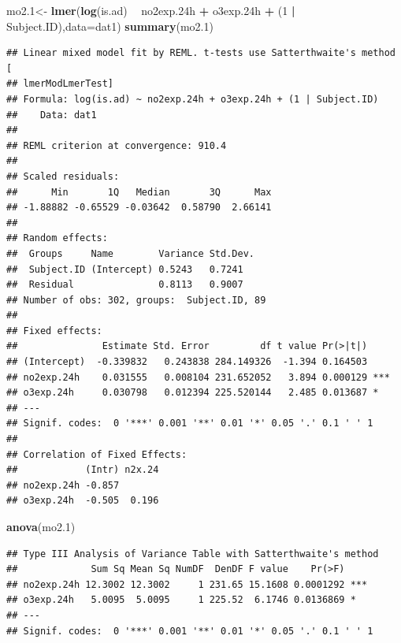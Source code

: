 \documentclass[12pt,]{article}
\newenvironment{Shaded}{\begin{snugshade}}{\end{snugshade}}
\newcommand{\DataTypeTok}[1]{\textcolor[rgb]{0.13,0.29,0.53}{#1}}
\newcommand{\DecValTok}[1]{\textcolor[rgb]{0.00,0.00,0.81}{#1}}
\newcommand{\FloatTok}[1]{\textcolor[rgb]{0.00,0.00,0.81}{#1}}
\newcommand{\KeywordTok}[1]{\textcolor[rgb]{0.13,0.29,0.53}{\textbf{#1}}}
\newcommand{\NormalTok}[1]{#1}
\newcommand{\OperatorTok}[1]{\textcolor[rgb]{0.81,0.36,0.00}{\textbf{#1}}}
\newcommand{\StringTok}[1]{\textcolor[rgb]{0.31,0.60,0.02}{#1}}
\begin{document}
\begin{Shaded}
\begin{Highlighting}[]
\NormalTok{mo2}\FloatTok{.1}\NormalTok{<-}\StringTok{ }\KeywordTok{lmer}\NormalTok{(}\KeywordTok{log}\NormalTok{(is.ad) }\OperatorTok{~}\StringTok{ }\NormalTok{no2exp}\FloatTok{.24}\NormalTok{h }\OperatorTok{+}\StringTok{ }\NormalTok{o3exp}\FloatTok{.24}\NormalTok{h }\OperatorTok{+}\StringTok{ }\NormalTok{(}\DecValTok{1} \OperatorTok{|}\StringTok{ }\NormalTok{Subject.ID),}\DataTypeTok{data=}\NormalTok{dat1)}
\KeywordTok{summary}\NormalTok{(mo2}\FloatTok{.1}\NormalTok{)}
\end{Highlighting}
\end{Shaded}

\begin{verbatim}
## Linear mixed model fit by REML. t-tests use Satterthwaite's method [
## lmerModLmerTest]
## Formula: log(is.ad) ~ no2exp.24h + o3exp.24h + (1 | Subject.ID)
##    Data: dat1
## 
## REML criterion at convergence: 910.4
## 
## Scaled residuals: 
##      Min       1Q   Median       3Q      Max 
## -1.88882 -0.65529 -0.03642  0.58790  2.66141 
## 
## Random effects:
##  Groups     Name        Variance Std.Dev.
##  Subject.ID (Intercept) 0.5243   0.7241  
##  Residual               0.8113   0.9007  
## Number of obs: 302, groups:  Subject.ID, 89
## 
## Fixed effects:
##               Estimate Std. Error         df t value Pr(>|t|)    
## (Intercept)  -0.339832   0.243838 284.149326  -1.394 0.164503    
## no2exp.24h    0.031555   0.008104 231.652052   3.894 0.000129 ***
## o3exp.24h     0.030798   0.012394 225.520144   2.485 0.013687 *  
## ---
## Signif. codes:  0 '***' 0.001 '**' 0.01 '*' 0.05 '.' 0.1 ' ' 1
## 
## Correlation of Fixed Effects:
##            (Intr) n2x.24
## no2exp.24h -0.857       
## o3exp.24h  -0.505  0.196
\end{verbatim}

\begin{Shaded}
\begin{Highlighting}[]
\KeywordTok{anova}\NormalTok{(mo2}\FloatTok{.1}\NormalTok{)}
\end{Highlighting}
\end{Shaded}

\begin{verbatim}
## Type III Analysis of Variance Table with Satterthwaite's method
##             Sum Sq Mean Sq NumDF  DenDF F value    Pr(>F)    
## no2exp.24h 12.3002 12.3002     1 231.65 15.1608 0.0001292 ***
## o3exp.24h   5.0095  5.0095     1 225.52  6.1746 0.0136869 *  
## ---
## Signif. codes:  0 '***' 0.001 '**' 0.01 '*' 0.05 '.' 0.1 ' ' 1
\end{verbatim}
\end{document}
